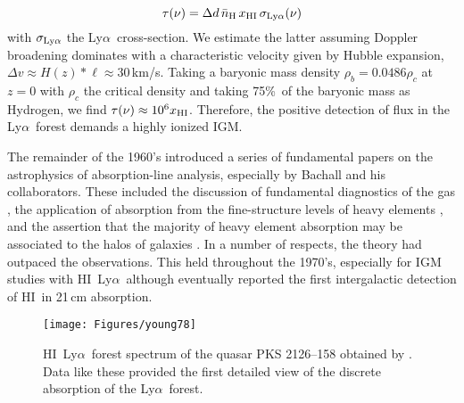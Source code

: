 \documentclass[graybox]{svmult}
\newcommand{\HI}{H{\sc I}}
\def\lya{Ly$\alpha$}
\def\mlya{{\rm Ly}\alpha}
\begin{document}
\begin{equation}
\tau(\nu) = \Delta d \, \bar n_{\rm H} \, x_{\rm HI} \, \sigma_{\mlya}(\nu)
\end{equation}
with $\sigma_{\mlya}$ the \lya\ cross-section.
We estimate the latter assuming Doppler broadening dominates
with a characteristic velocity given by Hubble expansion,
$\Delta v \approx H(z) * \ell \approx 30$\,km/s. 
Taking a baryonic mass density $\rho_b = 0.0486 \rho_c$
at $z=0$ with $\rho_c$ the critical density and
taking 75\%\ of the baryonic mass as Hydrogen,
we find $\tau(\nu) \approx 10^6 x_{\rm HI}$.
Therefore, the positive detection of flux in the 
\lya\ forest demands a highly ionized IGM.

The remainder of the 1960's introduced a series of 
fundamental papers on the astrophysics of absorption-line
analysis, especially by Bachall and his collaborators.
These included the discussion of fundamental diagnostics
of the gas \cite[]{bahcall67}, 
the application of absorption from the fine-structure 
levels of heavy elements \cite[]{bw68}, and the
assertion that the majority of heavy element absorption
may be associated to the halos of galaxies
\cite[]{bp69,bs69}.
In a number of respects, the theory had outpaced the
observations.
This held throughout the 1970's, especially for IGM
studies with \HI\ \lya\ although \cite{brown73}
eventually reported the first intergalactic detection of
\HI\ in 21\,cm absorption.

%
\begin{figure}[b]
\sidecaption
\texttt{[image: Figures/young78]}
%
%
\caption{\HI\ \lya\ forest spectrum of the quasar PKS 2126--158
obtained by \cite{young79}.  Data like these provided the first
detailed view of the discrete absorption of the \lya\ forest.
}
\label{fig:young}       %
\end{figure}
\end{document}
